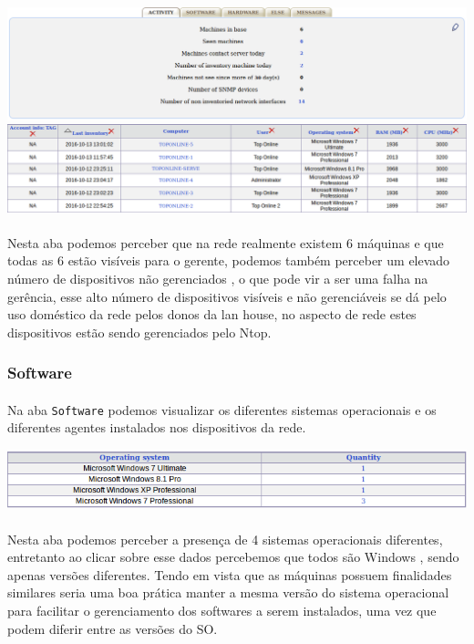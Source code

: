 \documentclass[a4paper]{article}
\begin{document}
   \includegraphics[scale = 0.3]{activity.png}\\
   
   \includegraphics[scale = 0.3]{maquinas.png}\\
 	\paragraph{}
 	Nesta aba podemos perceber que na rede realmente existem 6 máquinas e que todas as 6 estão visíveis para o gerente, podemos também perceber um elevado número de dispositivos não gerenciados , o que pode vir a ser uma falha na gerência, esse alto número de dispositivos visíveis e não gerenciáveis se dá pelo uso doméstico da rede pelos donos da lan house, no aspecto de rede estes dispositivos estão sendo gerenciados pelo Ntop.
    \subsubsection{Software}
    \paragraph{}
     Na aba \texttt{Software} podemos visualizar os diferentes sistemas operacionais e os diferentes agentes instalados nos dispositivos da rede.
    
    \includegraphics[scale = 0.5]{so.png}\\
    \paragraph{}
    Nesta aba podemos perceber a presença de 4 sistemas operacionais diferentes, entretanto ao clicar sobre esse dados percebemos que todos são Windows , sendo apenas versões diferentes. Tendo em vista que as máquinas possuem finalidades similares seria uma boa prática manter a mesma versão do sistema operacional para facilitar o gerenciamento dos softwares a serem instalados, uma vez que podem diferir entre as versões do SO.   
\end{document}
